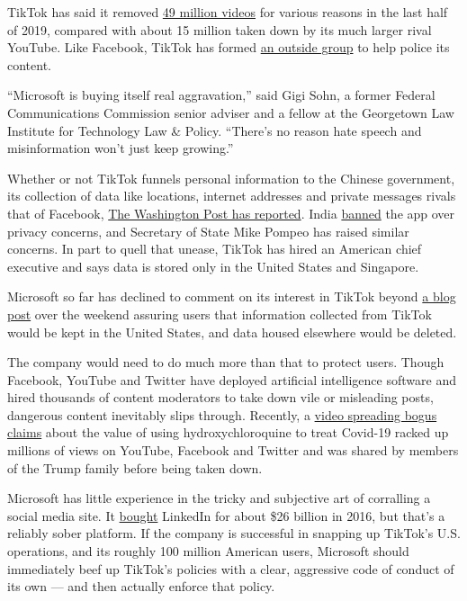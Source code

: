 TikTok has said it removed
\href{https://www.theverge.com/2020/7/9/21317832/tiktok-content-violations-videos-removed-49-million-2h2019-transparency-report}{49
million videos} for various reasons in the last half of 2019, compared
with about 15 million taken down by its much larger rival YouTube. Like
Facebook, TikTok has formed
\href{https://techcrunch.com/2020/03/18/tiktok-brings-in-outside-experts-to-help-it-craft-moderation-and-content-policies/}{an
outside group} to help police its content.

``Microsoft is buying itself real aggravation,'' said Gigi Sohn, a
former Federal Communications Commission senior adviser and a fellow at
the Georgetown Law Institute for Technology Law \& Policy. ``There's no
reason hate speech and misinformation won't just keep growing.''

Whether or not TikTok funnels personal information to the Chinese
government, its collection of data like locations, internet addresses
and private messages rivals that of Facebook,
\href{https://www.washingtonpost.com/technology/2020/07/13/tiktok-privacy/}{The
Washington Post has reported}. India
\href{https://www.nytimes.com/2020/06/30/technology/india-china-tiktok.html}{banned}
the app over privacy concerns, and Secretary of State Mike Pompeo has
raised similar concerns. In part to quell that unease, TikTok has hired
an American chief executive and says data is stored only in the United
States and Singapore.

Microsoft so far has declined to comment on its interest in TikTok
beyond
\href{https://blogs.microsoft.com/blog/2020/08/02/microsoft-to-continue-discussions-on-potential-tiktok-purchase-in-the-united-states/}{a
blog post} over the weekend assuring users that information collected
from TikTok would be kept in the United States, and data housed
elsewhere would be deleted.

The company would need to do much more than that to protect users.
Though Facebook, YouTube and Twitter have deployed artificial
intelligence software and hired thousands of content moderators to take
down vile or misleading posts, dangerous content inevitably slips
through. Recently, a
\href{https://www.nytimes.com/2020/07/28/technology/virus-video-trump.html}{video
spreading bogus claims} about the value of using hydroxychloroquine to
treat Covid-19 racked up millions of views on YouTube, Facebook and
Twitter and was shared by members of the Trump family before being taken
down.

Microsoft has little experience in the tricky and subjective art of
corralling a social media site. It
\href{https://www.nytimes.com/2016/12/08/technology/with-linkedin-microsoft-looks-to-avoid-past-acquisition-busts.html}{bought}
LinkedIn for about \$26 billion in 2016, but that's a reliably sober
platform. If the company is successful in snapping up TikTok's U.S.
operations, and its roughly 100 million American users, Microsoft should
immediately beef up TikTok's policies with a clear, aggressive code of
conduct of its own --- and then actually enforce that policy.

